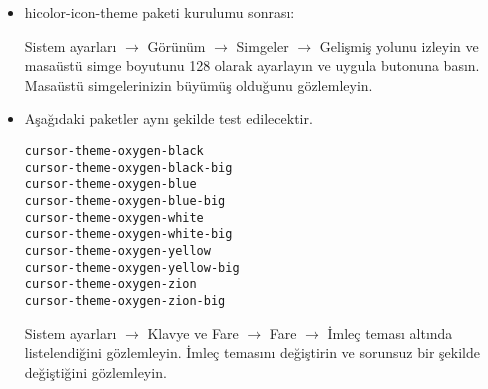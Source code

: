\documentclass[a4paper,10pt]{article}
\begin{document}
\begin{itemize}
\item hicolor-icon-theme paketi kurulumu sonrası:

Sistem ayarları $\rightarrow$ Görünüm $\rightarrow$ Simgeler $\rightarrow$ Gelişmiş yolunu izleyin ve masaüstü simge boyutunu 128 olarak ayarlayın ve uygula butonuna basın. Masaüstü simgelerinizin büyümüş olduğunu gözlemleyin.

 \item Aşağıdaki paketler aynı şekilde test edilecektir.
\begin{verbatim}
cursor-theme-oxygen-black
cursor-theme-oxygen-black-big
cursor-theme-oxygen-blue
cursor-theme-oxygen-blue-big
cursor-theme-oxygen-white
cursor-theme-oxygen-white-big
cursor-theme-oxygen-yellow
cursor-theme-oxygen-yellow-big
cursor-theme-oxygen-zion
cursor-theme-oxygen-zion-big
\end{verbatim}

Sistem ayarları $\rightarrow$  Klavye ve Fare $\rightarrow$ Fare $\rightarrow$ İmleç teması altında listelendiğini gözlemleyin. İmleç temasını değiştirin ve sorunsuz bir şekilde değiştiğini gözlemleyin.

\end{itemize}
\end{document}
